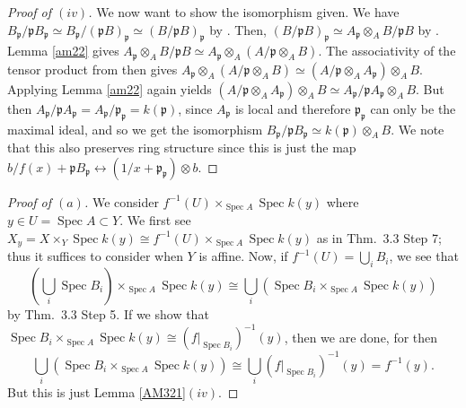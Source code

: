 \documentclass[12pt,letterpaper]{article}
\theoremstyle{definition}
\theoremstyle{remark}
\numberwithin{equation}{section}
\numberwithin{figure}{problem}
\DeclareMathOperator{\Spec}{Spec}
\begin{document}
\begin{proof}[Proof of $(iv)$]
  \par We now want to show the isomorphism given. We have $B_\mathfrak{p}/\mathfrak{p}B_\mathfrak{p} \simeq B_\mathfrak{p}/(\mathfrak{p}B)_\mathfrak{p} \simeq (B/\mathfrak{p}B)_\mathfrak{p}$ by \cite[Prop.~3.11v]{AM69}. Then, $(B/\mathfrak{p}B)_\mathfrak{p} \simeq A_\mathfrak{p} \otimes_A B/\mathfrak{p}B$ by \cite[Prop.~3.5]{AM69}. Lemma \ref{am22} gives $A_\mathfrak{p} \otimes_A B/\mathfrak{p}B \simeq A_\mathfrak{p} \otimes_A (A/\mathfrak{p} \otimes_A B)$. The associativity of the tensor product from \cite[Prop.~2.14ii]{AM69} then gives $A_\mathfrak{p} \otimes_A (A/\mathfrak{p} \otimes_A B) \simeq (A/\mathfrak{p} \otimes_A A_\mathfrak{p}) \otimes_A B$. Applying Lemma \ref{am22} again yields $(A/\mathfrak{p} \otimes_A A_\mathfrak{p}) \otimes_A B \simeq A_\mathfrak{p}/\mathfrak{p}A_\mathfrak{p} \otimes_A B$. But then $A_\mathfrak{p}/\mathfrak{p}A_\mathfrak{p} = A_\mathfrak{p}/\mathfrak{p}_\mathfrak{p} = k(\mathfrak{p})$, since $A_\mathfrak{p}$ is local and therefore $\mathfrak{p}_\mathfrak{p}$ can only be the maximal ideal, and so we get the isomorphism $B_\mathfrak{p}/\mathfrak{p}B_\mathfrak{p} \simeq k(\mathfrak{p}) \otimes_A B$. We note that this also preserves ring structure since this is just the map $b/f(x) + \mathfrak{p}B_\mathfrak{p} \leftrightarrow (1/x + \mathfrak{p}_\mathfrak{p}) \otimes b$.
\end{proof}
\begin{proof}[Proof of $(a)$]
  We consider $f^{-1}(U) \times_{\Spec A} \Spec k(y)$ where $y \in U = \Spec A \subset Y$. We first see $X_y = X \times_Y \Spec k(y) \cong f^{-1}(U) \times_{\Spec A} \Spec k(y)$ as in Thm.~3.3 Step 7; thus it suffices to consider when $Y$ is affine. Now, if $f^{-1}(U) = \bigcup_i B_i$, we see that
  \begin{equation*}
    \left( \bigcup_i \Spec B_i \right) \times_{\Spec A} \Spec k(y) \cong \bigcup_i \left( \Spec B_i \times_{\Spec A} \Spec k(y) \right)
  \end{equation*}
  by Thm.~3.3 Step 5. If we show that $\Spec B_i \times_{\Spec A} \Spec k(y) \cong (f\vert_{\Spec B_i})^{-1}(y)$, then we are done, for then
  \begin{equation*}
    \bigcup_i \left( \Spec B_i \times_{\Spec A} \Spec k(y) \right) \cong \bigcup_i (f\vert_{\Spec B_i})^{-1}(y) = f^{-1}(y).
  \end{equation*}
  But this is just Lemma \ref{AM321}$(iv)$.
\end{proof}
\end{document}
